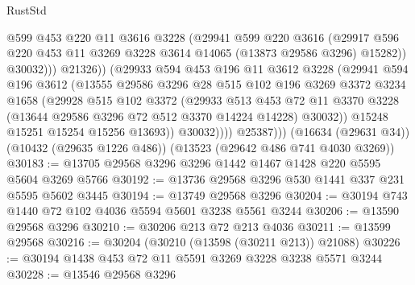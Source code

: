 \begin{lexlean}{RustStd}
\begin{coremodule}
                          @599
                          @453
                          @220
                          @11
                          @3616
                          @3228
                          (@29941
                            @599
                            @220
                            @3616
                            (@29917
                              @596
                              @220
                              @453
                              @11
                              @3269
                              @3228
                              @3614
                              @14065
                              (@13873 @29586 @3296)
                              @15282))
                          @30032)))
                    @21326))
                (@29933
                  @594
                  @453
                  @196
                  @11
                  @3612
                  @3228
                  (@29941
                    @594
                    @196
                    @3612
                    (@13555
                      @29586
                      @3296
                      @28
                      @515
                      @102
                      @196
                      @3269
                      @3372
                      @3234
                      @1658
                      (@29928
                        @515
                        @102
                        @3372
                        (@29933
                          @513
                          @453
                          @72
                          @11
                          @3370
                          @3228
                          (@13644 @29586 @3296 @72 @512 @3370 @14224 @14228)
                          @30032))
                      @15248
                      @15251
                      @15254
                      @15256
                      @13693))
                  @30032))))
          @25387)))
    (@16634 (@29631 @34))
    (@10432 (@29635 @1226 @486))
    (@13523 (@29642 @486 @741 @4030 @3269))
@30183 := @13705 @29568 @3296 @3296 @1442 @1467 @1428 @220 @5595 @5604 @3269 @5766
@30192 := @13736 @29568 @3296 @530 @1441 @337 @231 @5595 @5602 @3445
@30194 := @13749 @29568 @3296
@30204 := @30194 @743 @1440 @72 @102 @4036 @5594 @5601 @3238 @5561 @3244
@30206 := @13590 @29568 @3296
@30210 := @30206 @213 @72 @213 @4036
@30211 := @13599 @29568
@30216 := @30204 (@30210 (@13598 (@30211 @213)) @21088)
@30226 := @30194 @1438 @453 @72 @11 @5591 @3269 @3228 @3238 @5571 @3244
@30228 := @13546 @29568 @3296

\end{coremodule}
\end{lexlean}
